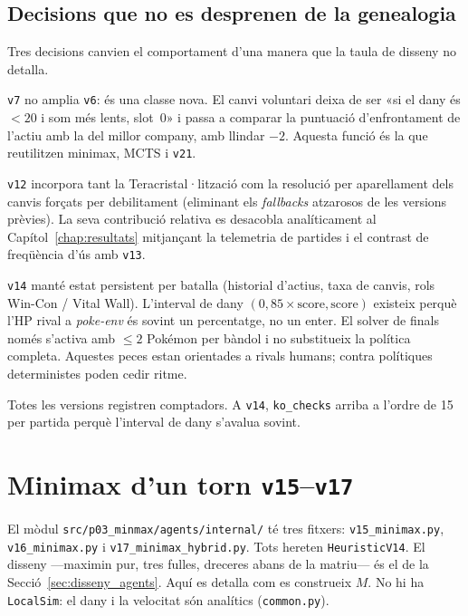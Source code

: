 \subsection{Decisions que no es desprenen de la genealogia}

Tres decisions canvien el comportament d'una manera que la taula de disseny no detalla.

\texttt{v7} no amplia \texttt{v6}: és una classe nova. El canvi voluntari deixa de ser «si el dany és $<20$ i som més lents, slot~0» i passa a comparar la puntuació d'enfrontament de l'actiu amb la del millor company, amb llindar $-2$. Aquesta funció és la que reutilitzen minimax, MCTS i \texttt{v21}.

\texttt{v12} incorpora tant la Teracristal·lització com la resolució per aparellament dels canvis forçats per debilitament (eliminant els \emph{fallbacks} atzarosos de les versions prèvies). La seva contribució relativa es desacobla analíticament al Capítol~\ref{chap:resultats} mitjançant la telemetria de partides i el contrast de freqüència d'ús amb \texttt{v13}.

\texttt{v14} manté estat persistent per batalla (historial d'actius, taxa de canvis, rols Win-Con / Vital Wall). L'interval de dany $(0{,}85\times\mathrm{score},\mathrm{score})$ existeix perquè l'HP rival a \textit{poke-env} és sovint un percentatge, no un enter. El solver de finals només s'activa amb $\le 2$ Pokémon per bàndol i no substitueix la política completa. Aquestes peces estan orientades a rivals humans; contra polítiques deterministes poden cedir ritme.

Totes les versions registren comptadors. A \texttt{v14}, \texttt{ko\_checks} arriba a l'ordre de 15 per partida perquè l'interval de dany s'avalua sovint.

\section{Minimax d'un torn \texttt{v15}--\texttt{v17}}
\label{sec:mm_impl}

El mòdul \texttt{src/p03\_minmax/agents/internal/} té tres fitxers: \texttt{v15\_minimax.py}, \texttt{v16\_minimax.py} i \texttt{v17\_minimax\_hybrid.py}. Tots hereten \texttt{HeuristicV14}. El disseny ---maximin pur, tres fulles, dreceres abans de la matriu--- és el de la Secció~\ref{sec:disseny_agents}. Aquí es detalla com es construeix $M$. No hi ha \texttt{LocalSim}: el dany i la velocitat són analítics (\texttt{common.py}).


